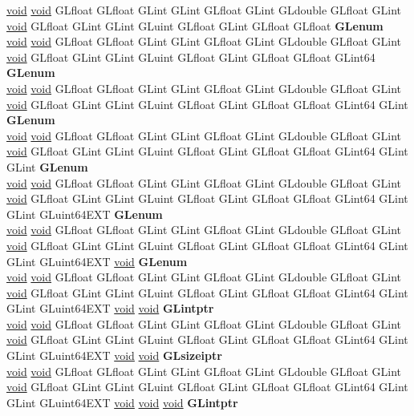 \begin{DoxyCompactItemize}
\begin{tabbing}
\>\hyperlink{interfacevoid}{void} \hyperlink{interfacevoid}{void} GLfloat GLfloat GLint GLint GLfloat GLint GLdouble GLfloat GLint \hyperlink{interfacevoid}{void} GLfloat GLint GLint GLuint GLfloat GLint GLfloat GLfloat {\bfseries GLenum}\\
\>\hyperlink{interfacevoid}{void} \hyperlink{interfacevoid}{void} GLfloat GLfloat GLint GLint GLfloat GLint GLdouble GLfloat GLint \hyperlink{interfacevoid}{void} GLfloat GLint GLint GLuint GLfloat GLint GLfloat GLfloat GLint64 {\bfseries GLenum}\\
\>\hyperlink{interfacevoid}{void} \hyperlink{interfacevoid}{void} GLfloat GLfloat GLint GLint GLfloat GLint GLdouble GLfloat GLint \hyperlink{interfacevoid}{void} GLfloat GLint GLint GLuint GLfloat GLint GLfloat GLfloat GLint64 GLint {\bfseries GLenum}\\
\>\hyperlink{interfacevoid}{void} \hyperlink{interfacevoid}{void} GLfloat GLfloat GLint GLint GLfloat GLint GLdouble GLfloat GLint \hyperlink{interfacevoid}{void} GLfloat GLint GLint GLuint GLfloat GLint GLfloat GLfloat GLint64 GLint GLint {\bfseries GLenum}\\
\>\hyperlink{interfacevoid}{void} \hyperlink{interfacevoid}{void} GLfloat GLfloat GLint GLint GLfloat GLint GLdouble GLfloat GLint \hyperlink{interfacevoid}{void} GLfloat GLint GLint GLuint GLfloat GLint GLfloat GLfloat GLint64 GLint GLint GLuint64EXT {\bfseries GLenum}\\
\>\hyperlink{interfacevoid}{void} \hyperlink{interfacevoid}{void} GLfloat GLfloat GLint GLint GLfloat GLint GLdouble GLfloat GLint \hyperlink{interfacevoid}{void} GLfloat GLint GLint GLuint GLfloat GLint GLfloat GLfloat GLint64 GLint GLint GLuint64EXT \hyperlink{interfacevoid}{void} {\bfseries GLenum}\\
\>\hyperlink{interfacevoid}{void} \hyperlink{interfacevoid}{void} GLfloat GLfloat GLint GLint GLfloat GLint GLdouble GLfloat GLint \hyperlink{interfacevoid}{void} GLfloat GLint GLint GLuint GLfloat GLint GLfloat GLfloat GLint64 GLint GLint GLuint64EXT \hyperlink{interfacevoid}{void} \hyperlink{interfacevoid}{void} {\bfseries GLintptr}\\
\>\hyperlink{interfacevoid}{void} \hyperlink{interfacevoid}{void} GLfloat GLfloat GLint GLint GLfloat GLint GLdouble GLfloat GLint \hyperlink{interfacevoid}{void} GLfloat GLint GLint GLuint GLfloat GLint GLfloat GLfloat GLint64 GLint GLint GLuint64EXT \hyperlink{interfacevoid}{void} \hyperlink{interfacevoid}{void} {\bfseries GLsizeiptr}\\
\>\hyperlink{interfacevoid}{void} \hyperlink{interfacevoid}{void} GLfloat GLfloat GLint GLint GLfloat GLint GLdouble GLfloat GLint \hyperlink{interfacevoid}{void} GLfloat GLint GLint GLuint GLfloat GLint GLfloat GLfloat GLint64 GLint GLint GLuint64EXT \hyperlink{interfacevoid}{void} \hyperlink{interfacevoid}{void} \hyperlink{interfacevoid}{void} {\bfseries GLintptr}\\

\end{tabbing}
\end{DoxyCompactItemize}
